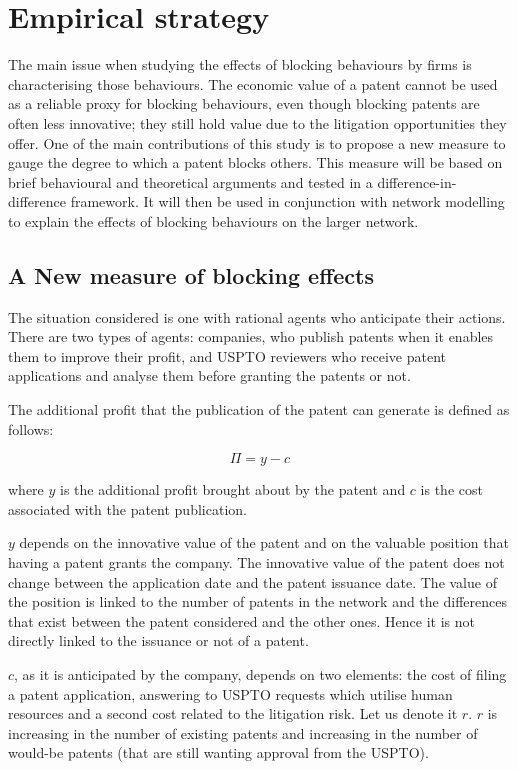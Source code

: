 \documentclass[12pt]{article}
\begin{document}
\section{Empirical strategy}
The main issue when studying the effects of blocking behaviours by firms is characterising those behaviours. The economic value of a patent cannot be used as a reliable proxy for blocking behaviours, even though blocking patents are often less innovative; they still hold value due to the litigation opportunities they offer. One of the main contributions of this study is to propose a new measure to gauge the degree to which a patent blocks others. This measure will be based on brief behavioural and theoretical arguments and tested in a difference-in-difference framework. It will then be used in conjunction with network modelling to explain the effects of blocking behaviours on the larger network.

\subsection{A New measure of blocking effects}

The situation considered is one with rational agents who anticipate their actions. There are two types of agents: companies, who publish patents when it enables them to improve their profit, and USPTO reviewers who receive patent applications and analyse them before granting the patents or not. 

The additional profit that the publication of the patent can generate is defined as follows:

\[
\Pi = y - c
\]

where $y$ is the additional profit brought about by the patent and $c$ is the cost associated with the patent publication. 

$y$ depends on the innovative value of the patent and on the valuable position that having a patent grants the company. The innovative value of the patent does not change between the application date and the patent issuance date. The value of the position is linked to the number of patents in the network and the differences that exist between the patent considered and the other ones. Hence it is not directly linked to the issuance or not of a patent. 

$c$, as it is anticipated by the company, depends on two elements: the cost of filing a patent application, answering to USPTO requests which utilise human resources and a second cost related to the litigation risk. Let us denote it $r$. $r$ is increasing in the number of existing patents and increasing in the number of would-be patents (that are still wanting approval from the USPTO). 
\end{document}
